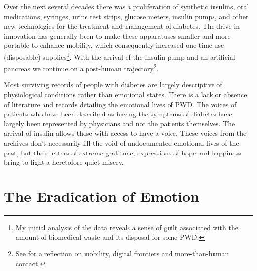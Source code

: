 \documentclass[12pt]{article}
\begin{document}
Over the next several decades there was a proliferation of synthetic insulins, oral medications, syringes, urine test strips, glucose meters, insulin pumps, and other new technologies \citep{phillip_attd_2012} for the treatment and management of diabetes. The drive in innovation has generally been to make these apparatuses smaller and more portable to enhance mobility, which consequently increased one-time-use (disposable) supplies\footnote{My initial analysis of the data reveals a sense of guilt associated with the amount of biomedical waste and its disposal for some PWD.}. With the arrival of the insulin pump and an artificial pancreas we continue on a post-human trajectory\footnote{See \citet{wilson_more_2011} for a reflection on mobility, digital frontiers and more-than-human contact.}.  

Most surviving records of people with diabetes are largely descriptive of physiological conditions rather than emotional states. There is a lack or absence of literature and records detailing the emotional lives of PWD. The voices of patients who have been described as having the symptoms of diabetes have largely been represented by physicians and not the patients themselves.  The arrival of insulin allows those with access to have a voice. These voices from the archives don't necessarily fill the void of undocumented emotional lives of the past, but their letters of extreme gratitude, expressions of hope and happiness bring to light a heretofore quiet misery. 

\section{The Eradication of Emotion} 
\doublespacing
\end{document}

